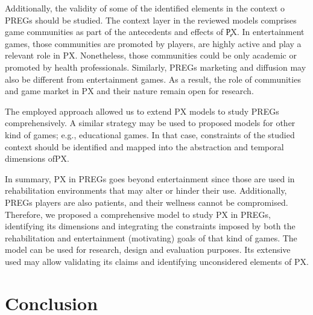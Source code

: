 Additionally, the validity of some of the identified elements in the context o \acp{PREG} should be studied. The context layer in the reviewed models comprises game communities as part of the antecedents and effects of \c{PX}. In entertainment games, those communities are promoted by players, are highly active and play a relevant role in \ac{PX}. Nonetheless, those communities could be only academic or promoted by health professionals. Similarly, \acp{PREG} marketing and diffusion may also be different from entertainment games. As a result, the role of communities and game market in \ac{PX} and their nature remain open for research.

The employed approach allowed us to extend \ac{PX} models to study \acp{PREG} comprehensively. A similar strategy may be used to proposed models for other kind of games; e.g., educational games. In that case, constraints of the studied context should be identified and mapped into the abstraction and temporal dimensions of\ac{PX}.

In summary, \ac{PX} in \acp{PREG} goes beyond entertainment since those are used in rehabilitation environments that may alter or hinder their use. Additionally, \acp{PREG} players are also patients, and their wellness cannot be compromised. Therefore, we proposed a comprehensive model to study \ac{PX} in \acp{PREG}, identifying its dimensions and integrating the constraints imposed by both the rehabilitation and entertainment (motivating) goals of that kind of games. The model can be used for research, design and evaluation purposes. Its extensive used may allow validating its claims and identifying unconsidered elements of \ac{PX}. 

\section{Conclusion} %
\label{sec:conclusion_model}

